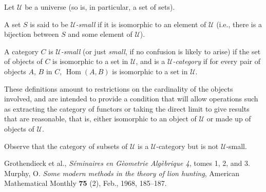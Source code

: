 \documentclass[12pt]{article}
\DeclareMathOperator{\Hom}{Hom}
\begin{document}
Let $\mathcal{U}$ be a universe (so is, in particular, a set of sets).

A set $S$ is said to be \emph{$\mathcal{U}$-small} if it is isomorphic to an element of $\mathcal{U}$ (i.e., there is a bijection between $S$ and some element of $\mathcal{U}$).

A category $C$ is \emph{$\mathcal{U}$-small} (or just \emph{small}, if no confusion is likely to arise) if the set of objects of $C$ is isomorphic to a set in $\mathcal{U}$, and is a \emph{$\mathcal{U}$-category} if for every pair of objects $A$, $B$ in $C$, $\Hom(A,B)$ is isomorphic to a set in $\mathcal{U}$.

These definitions amount to restrictions on the cardinality of the objects involved, and are intended to provide a condition that will allow operations such as extracting the category of functors or taking the direct limit to give results that are reasonable, that is, either isomorphic to an object of $\mathcal{U}$ or made up of objects of $\mathcal{U}$. 

Observe that the category of subsets of $\mathcal{U}$ is a $\mathcal{U}$-category but is not $\mathcal{U}$-small.

\begin{thebibliography}{9}

 Grothendieck et al., \emph{S\'eminaires en G\`eometrie Alg\`ebrique 4}, tomes 1, 2, and 3.
  Murphy, O.  \emph{Some modern methods in the theory of lion hunting}, American Mathematical Monthly {\bf 75} (2), Feb., 1968, 185--187.
\end{thebibliography}
\end{document}
